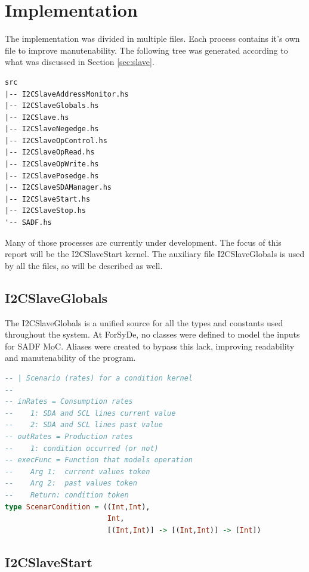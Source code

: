 \documentclass{article}
\begin{document}

\section{Implementation} \label{sec:imple}
The implementation was divided in multiple files. Each process contains it's own file to improve manutenability. The following tree was generated according to what was discussed in Section \ref{sec:slave}.
\begin{lstlisting}[frame=single, basicstyle=\small, caption={Files of implementation}, captionpos=b]
src
|-- I2CSlaveAddressMonitor.hs
|-- I2CSlaveGlobals.hs
|-- I2CSlave.hs
|-- I2CSlaveNegedge.hs
|-- I2CSlaveOpControl.hs
|-- I2CSlaveOpRead.hs
|-- I2CSlaveOpWrite.hs
|-- I2CSlavePosedge.hs
|-- I2CSlaveSDAManager.hs
|-- I2CSlaveStart.hs
|-- I2CSlaveStop.hs
'-- SADF.hs
\end{lstlisting}
Many of those processes are currently under development. The focus of this report will be the I2CSlaveStart kernel. The auxiliary file I2CSlaveGlobals is used by all the files, so will be described as well.

\subsection{I2CSlaveGlobals}

The I2CSlaveGlobals is a unified source for all the types and constants used throughout the system. At ForSyDe, no classes were defined to model the inputs for SADF MoC. Aliases were created to bypass this lack, improving readability and manutenability of the program.
\begin{lstlisting}[frame=single, basicstyle=\small, language={Haskell}, caption={Alias for the Condition's scenario type}, captionpos=b]
-- | Scenario (rates) for a condition kernel
--
-- inRates = Consumption rates
--    1: SDA and SCL lines current value
--    2: SDA and SCL lines past value
-- outRates = Production rates
--    1: condition occurred (or not)
-- execFunc = Function that models operation
--    Arg 1:  current values token
--    Arg 2:  past values token
--    Return: condition token
type ScenarCondition = ((Int,Int),
                        Int,
                        [(Int,Int)] -> [(Int,Int)] -> [Int])
\end{lstlisting}

\subsection{I2CSlaveStart}
\end{document}
